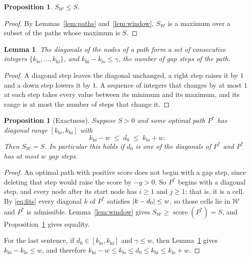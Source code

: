 \documentclass[11pt]{article}
\theoremstyle{plain}
\newtheorem{proposition}[theorem]{Proposition}
\newtheorem{lemma}[theorem]{Lemma}
\theoremstyle{definition}
\theoremstyle{remark}
\DeclareMathOperator{\score}{score}
\DeclarePairedDelimiter{\abs}{\lvert}{\rvert}
\newcommand{\W}{\mathcal{W}}
\newcommand{\klo}{k_{\mathrm{lo}}}
\newcommand{\khi}{k_{\mathrm{hi}}}
\begin{document}
\begin{proposition}\label{prop:upper}
$S_{\W} \le S$.
\end{proposition}

\begin{proof}
By Lemmas~\ref{lem:paths} and~\ref{lem:window}, $S_{\W}$ is a maximum over a
subset of the paths whose maximum is $S$.
\end{proof}

\begin{lemma}\label{lem:interval}
The diagonals of the nodes of a path form a set of consecutive integers
$\{\klo, \dots, \khi\}$, and $\khi - \klo \le \gamma$, the number of gap steps of
the path.
\end{lemma}

\begin{proof}
A diagonal step leaves the diagonal unchanged, a right step raises it by $1$ and
a down step lowers it by $1$. A sequence of integers that changes by at most $1$
at each step takes every value between its minimum and its maximum, and its
range is at most the number of steps that change it.
\end{proof}

\begin{proposition}[Exactness]\label{prop:exact}
Suppose $S > 0$ and some optimal path $P^{*}$ has diagonal range
$[\klo, \khi]$ with
\begin{equation}\label{eq:fits}
\khi - w \;\le\; d_0 \;\le\; \klo + w .
\end{equation}
Then $S_{\W} = S$. In particular this holds if $d_0$ is one of the diagonals of
$P^{*}$ and $P^{*}$ has at most $w$ gap steps.
\end{proposition}

\begin{proof}
An optimal path with positive score does not begin with a gap step, since
deleting that step would raise the score by $-g > 0$. So $P^{*}$ begins with a
diagonal step, and every node after its start node has $i \ge 1$ and $j \ge 1$;
that is, it is a cell. By \eqref{eq:fits} every diagonal $k$ of $P^{*}$
satisfies $\abs{k - d_0} \le w$, so those cells lie in $\W$ and $P^{*}$ is
admissible. Lemma~\ref{lem:window} gives $S_{\W} \ge \score(P^{*}) = S$, and
Proposition~\ref{prop:upper} gives equality.

For the last sentence, if $d_0 \in [\klo,\khi]$ and $\gamma \le w$, then
Lemma~\ref{lem:interval} gives $\khi - \klo \le w$, and therefore
$\khi - w \le \klo \le d_0 \le \khi \le \klo + w$.
\end{proof}
\end{document}
